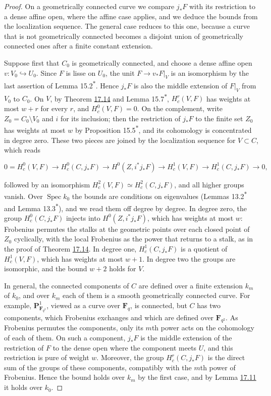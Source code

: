 \documentclass[11pt]{article}
\newcommand{\bpout}[1]{#1\textsuperscript{\hyperlink{bp-outside}{\ensuremath{\ast}}}}
\begin{document}
\begin{proof}[{Proof}]\label{bp48}%
On a geometrically connected curve we compare \(j_*F\) with its restriction to a dense affine open, where the affine case applies, and we deduce the bounds from the localization sequence. The general case reduces to this one, because a curve that is not geometrically connected becomes a disjoint union of geometrically connected ones after a finite constant extension.

Suppose first that \(C_0\) is geometrically connected, and choose a dense affine open \(v:V_0\hookrightarrow U_0\). Since \(F\) is lisse on \(U_0\), the unit \(F\to v_*F|_V\) is an isomorphism by the last assertion of Lemma \bpout{15.2}. Hence \(j_*F\) is also the middle extension of \(F|_V\) from \(V_0\) to \(C_0\). On \(V\), by Theorem \hyperref[bp44]{17.14} and Lemma \bpout{15.7}, \(H_c^r(V,F)\) has weights at most \(w+r\) for every \(r\), and \(H_c^0(V,F)=0\). On the complement, write \(Z_0=C_0\setminus V_0\) and \(i\) for its inclusion; then the restriction of \(j_*F\) to the finite set \(Z_0\) has weights at most \(w\) by Proposition \bpout{15.5}, and its cohomology is concentrated in degree zero. These two pieces are joined by the localization sequence for \(V\subset C\), which reads

\[
0=H_c^0(V,F)\to H_c^0(C,j_*F)\to H^0(Z,i^*j_*F)\to H_c^1(V,F)
\to H_c^1(C,j_*F)\to0,
\]

followed by an isomorphism \(H_c^2(V,F)\simeq H_c^2(C,j_*F)\), and all higher groups vanish. Over \(\operatorname{Spec}k_0\) the bounds are conditions on eigenvalues (Lemmas \bpout{13.2} and \bpout{Lemma 13.3}), and we read them off degree by degree. In degree zero, the group \(H_c^0(C,j_*F)\) injects into \(H^0(Z,i^*j_*F)\), which has weights at most \(w\): Frobenius permutes the stalks at the geometric points over each closed point of \(Z_0\) cyclically, with the local Frobenius as the power that returns to a stalk, as in the proof of Theorem \hyperref[bp44]{17.14}. In degree one, \(H_c^1(C,j_*F)\) is a quotient of \(H_c^1(V,F)\), which has weights at most \(w+1\). In degree two the groups are isomorphic, and the bound \(w+2\) holds for \(V\).

In general, the connected components of \(C\) are defined over a finite extension \(k_m\) of \(k_0\), and over \(k_m\) each of them is a smooth geometrically connected curve. For example, \(\mathbf P^1_{\mathbf F_{q^2}}\), viewed as a curve over \(\mathbf F_q\), is connected, but \(C\) has two components, which Frobenius exchanges and which are defined over \(\mathbf F_{q^2}\). As Frobenius permutes the components, only its \(m\)th power acts on the cohomology of each of them. On such a component, \(j_*F\) is the middle extension of the restriction of \(F\) to the dense open where the component meets \(U\), and this restriction is pure of weight \(w\). Moreover, the group \(H^r_c(C,j_*F)\) is the direct sum of the groups of these components, compatibly with the \(m\)th power of Frobenius. Hence the bound holds over \(k_m\) by the first case, and by Lemma \hyperref[bp35]{17.11} it holds over \(k_0\).
\end{proof}
\end{document}
